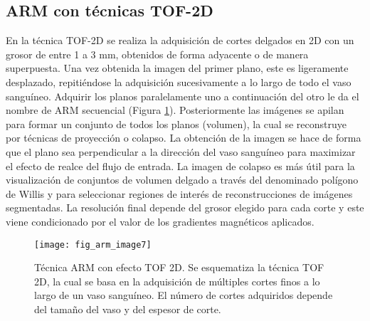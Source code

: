 \subsection{ARM con técnicas TOF-2D}
En la técnica TOF-2D se realiza la adquisición de cortes delgados en 2D con un grosor de entre 1 a 3 mm, obtenidos de forma adyacente o de manera superpuesta. Una vez obtenida la imagen del primer plano, este es ligeramente desplazado, repitiéndose la adquisición sucesivamente a lo largo de todo el vaso sanguíneo. Adquirir los planos paralelamente uno a continuación del otro le da el nombre de ARM secuencial (Figura \ref{fig:arm_image7}). Posteriormente las imágenes se apilan para formar un conjunto de todos los planos (volumen), la cual se reconstruye por técnicas de proyección o colapso. La obtención de la imagen se hace de forma que el plano sea perpendicular a la dirección del vaso sanguíneo para maximizar el efecto de realce del flujo de entrada. La imagen de colapso es más útil para la visualización de conjuntos de volumen delgado a través del denominado polígono de Willis y para seleccionar regiones de interés de reconstrucciones de imágenes segmentadas. La resolución final depende del grosor elegido para cada corte y este viene condicionado por el valor de los gradientes magnéticos aplicados. 


\begin{figure}[htbp]
\begin{figg}
 \texttt{[image: fig\_arm\_image7]}
 \caption{
Técnica ARM con efecto TOF 2D. Se esquematiza la técnica TOF 2D, la cual se basa en la adquisición de múltiples cortes finos a lo largo de un vaso sanguíneo. El número de cortes adquiridos depende del tamaño del vaso y del espesor de corte. 
 }
 \label{fig:arm_image7}
\end{figg}
\end{figure}



